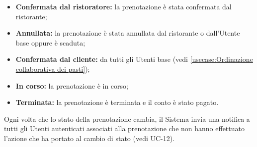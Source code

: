 \begin{itemize}
\begin{itemize}
\begin{itemize}
			            \item \textbf{Confermata dal ristoratore:} la prenotazione è
			                  stata confermata dal ristorante;

			            \item \textbf{Annullata:} la prenotazione è
			                  stata annullata dal ristorante o dall'Utente base
			                  oppure è scaduta;

			            \item \textbf{Confermata dal cliente:} da tutti gli
			                  Utenti base (vedi
			                  \autoref{usecase:Ordinazione collaborativa dei pasti});

			            \item \textbf{In corso:} la prenotazione è
			                  in corso;

			            \item \textbf{Terminata:} la prenotazione è
			                  terminata e il conto è stato pagato.
		            \end{itemize}

		            Ogni volta che lo stato della prenotazione cambia, il Sistema
		            invia una notifica a tutti gli Utenti autenticati associati alla
		            prenotazione che non hanno effettuato l'azione che ha portato al
		            cambio di stato (vedi UC-12).
	      \end{itemize}

\end{itemize}
